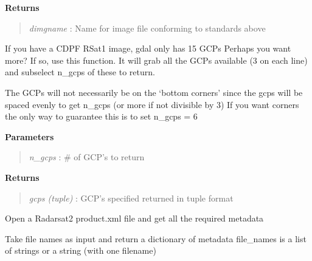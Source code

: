 \documentclass[letterpaper,10pt,openany,oneside]{sphinxmanual}
\begin{document}
\begin{fulllineitems}
\begin{fulllineitems}
\begin{description}
\end{description}

\textbf{Returns}
\begin{quote}

\emph{dimgname} : Name for image file conforming to standards above
\end{quote}

\end{fulllineitems}


\begin{fulllineitems}
\label{code:Metadata.Metadata.getMoreGCPs}
If you have a CDPF RSat1 image, gdal only has 15 GCPs
Perhaps you want more?  If so, use this function.
It will grab all the GCPs available (3 on each line) and
subselect n\_gcps of these to return.

The GCPs will not necessarily be on the `bottom corners' since the gcps
will be spaced evenly to get n\_gcps (or more if not divisible by 3)
If you want corners the only way to guarantee this is to set n\_gcps = 6

\textbf{Parameters}
\begin{quote}

\emph{n\_gcps}      : \# of GCP's to return
\end{quote}

\textbf{Returns}
\begin{quote}

\emph{gcps (tuple)} : GCP's specified returned in tuple format
\end{quote}

\end{fulllineitems}


\begin{fulllineitems}
\label{code:Metadata.Metadata.getRS2metadata}
Open a Radarsat2 product.xml file and get all the required metadata

\end{fulllineitems}


\begin{fulllineitems}
\label{code:Metadata.Metadata.get_ceos_metadata}
Take file names as input and return a dictionary of metadata
file\_names is a list of strings or a string (with one filename)


\end{fulllineitems}
\end{fulllineitems}
\end{document}
